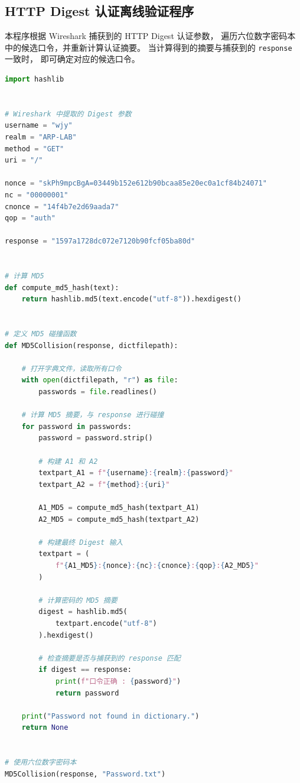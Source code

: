 \appendix

\subsection{HTTP Digest 认证离线验证程序}
\label{appendix:digest_crack}

本程序根据 Wireshark 捕获到的 HTTP Digest 认证参数，
遍历六位数字密码本中的候选口令，并重新计算认证摘要。
当计算得到的摘要与捕获到的 \texttt{response} 一致时，
即可确定对应的候选口令。

\begin{lstlisting}[language=Python, caption={HTTP Digest 认证离线验证程序}, label={lst:digest_crack}]
import hashlib


# Wireshark 中提取的 Digest 参数
username = "wjy"
realm = "ARP-LAB"
method = "GET"
uri = "/"

nonce = "skPh9mpcBgA=03449b152e612b90bcaa85e20ec0a1cf84b24071"
nc = "00000001"
cnonce = "14f4b7e2d69aada7"
qop = "auth"

response = "1597a1728dc072e7120b90fcf05ba80d"


# 计算 MD5
def compute_md5_hash(text):
    return hashlib.md5(text.encode("utf-8")).hexdigest()


# 定义 MD5 碰撞函数
def MD5Collision(response, dictfilepath):

    # 打开字典文件，读取所有口令
    with open(dictfilepath, "r") as file:
        passwords = file.readlines()

    # 计算 MD5 摘要，与 response 进行碰撞
    for password in passwords:
        password = password.strip()

        # 构建 A1 和 A2
        textpart_A1 = f"{username}:{realm}:{password}"
        textpart_A2 = f"{method}:{uri}"

        A1_MD5 = compute_md5_hash(textpart_A1)
        A2_MD5 = compute_md5_hash(textpart_A2)

        # 构建最终 Digest 输入
        textpart = (
            f"{A1_MD5}:{nonce}:{nc}:{cnonce}:{qop}:{A2_MD5}"
        )

        # 计算密码的 MD5 摘要
        digest = hashlib.md5(
            textpart.encode("utf-8")
        ).hexdigest()

        # 检查摘要是否与捕获到的 response 匹配
        if digest == response:
            print(f"口令正确 : {password}")
            return password

    print("Password not found in dictionary.")
    return None


# 使用六位数字密码本
MD5Collision(response, "Password.txt")
\end{lstlisting}
